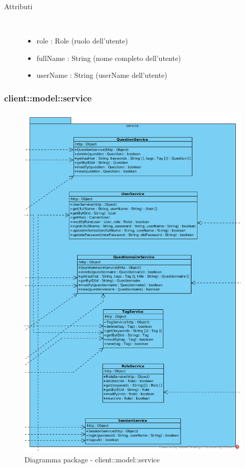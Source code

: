 \begin{description}
\item[Attributi] \hfill \\
 \vspace{-7mm}
\begin{itemize}
\item role : Role (ruolo dell'utente)
\item fullName : String (nome completo dell'utente)
\item userName : String (userName dell'utente)
\end{itemize}

\end{description}

\vspace{0.5cm}
\subsubsection{client::model::service}
\begin{center}
		\begin{figure}[H]
			\centering \includegraphics[scale=4, max width=\textwidth, max height=\myheight]{../img/diagrammiClassi/client/model/service.png}
			\caption{Diagramma package - client::model::service}
		\end{figure}
	\end{center}\hypertarget{client::model::service::SessionService}{}
